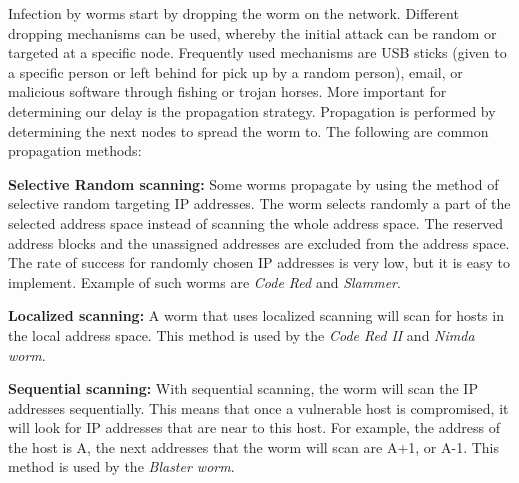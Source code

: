 Infection by worms start by dropping the worm on the network. Different dropping mechanisms can be used, whereby the initial attack can be random or targeted at a specific node. Frequently used mechanisms are USB sticks (given to a specific person or left behind for pick up by a random person), email, or malicious software through fishing or trojan horses. More important for determining our delay is the propagation strategy. Propagation is performed by determining the next nodes to spread the worm to. The following are common propagation methods: 
\begin{description}

\item \textbf{Selective Random scanning:} Some worms propagate by using the method of selective random targeting IP addresses. The worm selects randomly a part of the selected address space instead of scanning the whole address space. The reserved address blocks and the unassigned addresses are excluded from the address space. The rate of success for randomly chosen IP addresses is very low, but it is easy to implement. Example of such worms are \textit{Code Red} and \textit{Slammer}.

\item \textbf{Localized scanning:} A worm that uses localized scanning will scan for hosts in the local address space. This method is used by the \textit{Code Red II} and \textit{Nimda worm}.


\item \textbf{Sequential scanning:}
With sequential scanning, the worm will scan the IP addresses sequentially. This means that once a vulnerable host is compromised, it will look for IP addresses that are near to this host. For example, the address of the host is A, the next addresses that the worm will scan are A+1, or A-1. This method is used by the \textit{Blaster worm}.


\end{description}
